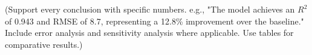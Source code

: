 (Support every conclusion with specific numbers.
e.g., "The model achieves an $R^2$ of 0.943 and RMSE of 8.7, representing
a 12.8\% improvement over the baseline."
Include error analysis and sensitivity analysis where applicable.
Use tables for comparative results.)

